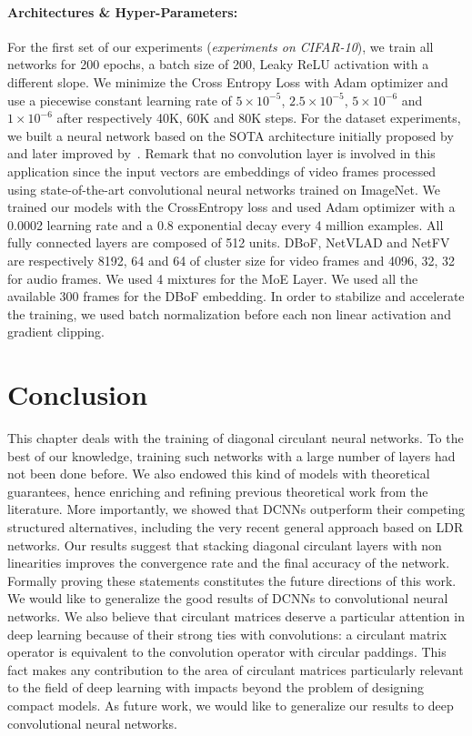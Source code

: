 \paragraph{Architectures \& Hyper-Parameters:} 
For the first set of our experiments (\emph{experiments on CIFAR-10}), we train all networks for 200 epochs, a batch size of 200, Leaky ReLU activation with a different slope.
We minimize the Cross Entropy Loss with Adam optimizer and use a piecewise constant learning rate of $5 \times 10^{-5}$, $2.5\times10^{-5}$, $5\times10^{-6}$ and $1\times10^{-6}$ after respectively 40K, 60K and 80K steps.
For the \yt dataset experiments, we built a neural network based on the SOTA architecture initially proposed by~\citet{abu2016youtube} and later improved by~\citet{miech2017learnable}.
Remark that no convolution layer is involved in this application since the input vectors are embeddings of video frames processed using state-of-the-art convolutional neural networks trained on ImageNet.
We trained our models with the CrossEntropy loss and used Adam optimizer with a 0.0002 learning rate and a 0.8 exponential decay every 4 million examples.
All fully connected layers are composed of 512 units.
DBoF, NetVLAD and NetFV are respectively 8192, 64 and 64 of cluster size for video frames and 4096, 32, 32 for audio frames.
We used 4 mixtures for the MoE Layer.
We used all the available 300 frames for the DBoF embedding.
In order to stabilize and accelerate the training, we used batch normalization before each non linear activation and gradient clipping. 

\section{Conclusion}
\label{section:ch3-conclusion}

This chapter deals with the training of diagonal circulant neural networks.
To the best of our knowledge, training such networks with a large number of layers had not been done before.
We also endowed this kind of models with theoretical guarantees, hence enriching and refining previous theoretical work from the literature.
More importantly, we showed that DCNNs outperform their competing structured alternatives, including the very recent general approach based on LDR networks.
Our results suggest that stacking diagonal circulant layers with non linearities improves the convergence rate and the final accuracy of the network.
Formally proving these statements constitutes the future directions of this work.
We would like to generalize the good results of DCNNs to convolutional neural networks.
We also believe that circulant matrices deserve a particular attention in deep learning because of their strong ties with convolutions: a circulant matrix operator is equivalent to the convolution operator with circular paddings.
This fact makes any contribution to the area of circulant matrices particularly relevant to the field of deep learning with impacts beyond the problem of designing compact models.
As future work, we would like to generalize our results to deep convolutional neural networks. 


